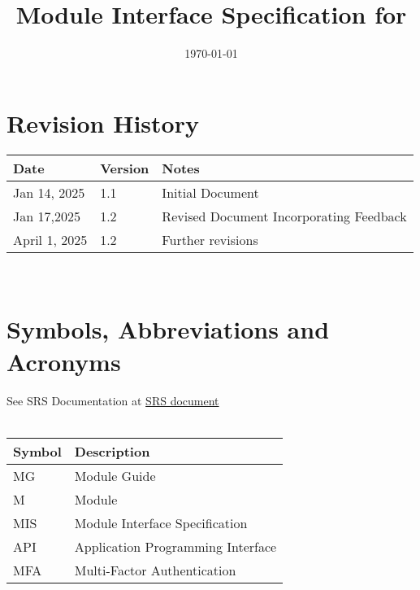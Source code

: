 \documentclass[12pt, titlepage]{article}
\begin{document}
\title{Module Interface Specification for \progname{}}

\author{\authname}

\date{\today}

\maketitle


\section{Revision History}

\begin{tabularx}{\textwidth}{p{3cm}p{2cm}X}
\toprule {\bf Date} & {\bf Version} & {\bf Notes}\\
\midrule
Jan 14, 2025 & 1.1 & Initial Document\\
Jan 17,2025 & 1.2 & Revised Document Incorporating Feedback\\
April 1, 2025 & 1.2 & Further revisions\\


\bottomrule
\end{tabularx}

~\newpage

\section{Symbols, Abbreviations and Acronyms}

See SRS Documentation at \href{https://github.com/Inreet-Kaur/capstone/blob/main/docs/SRS/SRS.pdf} {SRS document}\\
\\


\begin{tabularx}{\textwidth}{p{2cm}X}
  \toprule
  {\bf Symbol} & {\bf Description}                                                                                     \\
  \midrule
  MG           & Module Guide                                                                                          \\
  M            & Module                                                                                                \\
  MIS          & Module Interface Specification                                                                        \\
  API          & Application Programming Interface                                                                     \\
  MFA          & Multi-Factor Authentication                                                                           \\
  \bottomrule
\end{tabularx}
\end{document}
